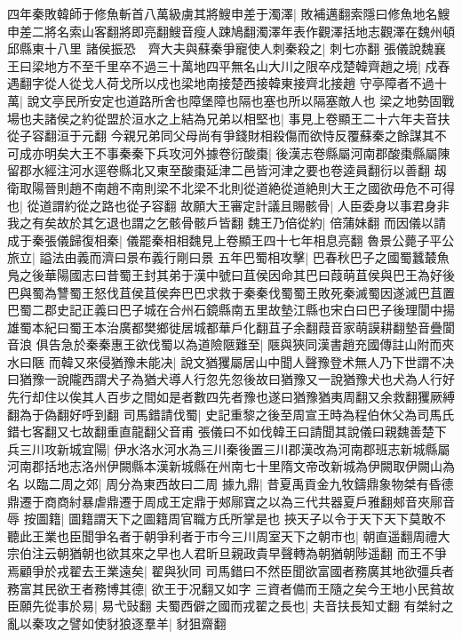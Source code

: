 四年秦敗韓師于修魚斬首八萬級虜其將䱸申差于濁澤|{
	敗補邁翻索隱曰修魚地名䱸申差二將名索山客翻將即亮翻䱸音瘦人踈鳩翻濁澤年表作觀澤括地志觀澤在魏州頓邱縣東十八里}
諸侯振恐　齊大夫與蘇秦爭寵使人刺秦殺之|{
	刺七亦翻}
張儀說魏襄王曰梁地方不至千里卒不過三十萬地四平無名山大川之限卒戍楚韓齊趙之境|{
	戍舂遇翻字從人從戈人荷戈所以戍也梁地南接楚西接韓東接齊北接趙}
守亭障者不過十萬|{
	說文亭民所安定也道路所舍也障堡障也隔也塞也所以隔塞敵人也}
梁之地勢固戰場也夫諸侯之約從盟於洹水之上結為兄弟以相堅也|{
	事見上卷顯王二十六年夫音扶從子容翻洹于元翻}
今親兄弟同父母尚有爭錢財相殺傷而欲恃反覆蘇秦之餘謀其不可成亦明矣大王不事秦秦下兵攻河外據卷衍酸棗|{
	後漢志卷縣屬河南郡酸棗縣屬陳留郡水經注河水逕卷縣北又東至酸棗延津二邑皆河津之要也卷逵員翻衍以善翻}
刼衛取陽晉則趙不南趙不南則梁不北梁不北則從道絶從道絶則大王之國欲毋危不可得也|{
	從道謂約從之路也從子容翻}
故願大王審定計議且賜骸骨|{
	人臣委身以事君身非我之有矣故於其乞退也謂之乞骸骨骸戶皆翻}
魏王乃倍從約|{
	倍蒲妹翻}
而因儀以請成于秦張儀歸復相秦|{
	儀罷秦相相魏見上卷顯王四十七年相息亮翻}
魯景公薨子平公旅立|{
	謚法由義而濟曰景布義行剛曰景}
五年巴蜀相攻擊|{
	巴春秋巴子之國蜀蠶樷魚鳬之後華陽國志曰昔蜀王封其弟于漢中號曰苴侯因命其巴曰葭萌苴侯與巴王為好後巴與蜀為讐蜀王怒伐苴侯苴侯奔巴巴求救于秦秦伐蜀蜀王敗死秦滅蜀因遂滅巴苴置巴蜀二郡史記正義曰巴子城在合州石鏡縣南五里故墊江縣也宋白曰巴子後理閬中揚雄蜀本紀曰蜀王本治廣都樊鄉徙居城都華戶化翻苴子余翻葭音家萌謨耕翻墊音疊閬音浪}
俱告急於秦秦惠王欲伐蜀以為道險陿難至|{
	陿與狹同漢書趙充國傳註山附而夾水曰陿}
而韓又來侵猶豫未能决|{
	說文猶玃屬居山中聞人聲豫登术無人乃下世謂不决曰猶豫一說隴西謂犬子為猶犬導人行忽先忽後故曰猶豫又一說猶豫犬也犬為人行好先行却住以俟其人百步之間如是者數四先者豫也遂曰猶豫猶夷周翻又余救翻玃厥縛翻為于偽翻好呼到翻}
司馬錯請伐蜀|{
	史記重黎之後至周宣王時為程伯休父為司馬氏錯七客翻又七故翻重直龍翻父音甫}
張儀曰不如伐韓王曰請聞其說儀曰親魏善楚下兵三川攻新城宜陽|{
	伊水洛水河水為三川秦後置三川郡漢改為河南郡班志新城縣屬河南郡括地志洛州伊闕縣本漢新城縣在州南七十里隋文帝改新城為伊闕取伊闕山為名}
以臨二周之郊|{
	周分為東西故曰二周}
據九鼎|{
	昔夏禹貢金九牧鑄鼎象物桀有昏德鼎遷于商商紂暴虐鼎遷于周成王定鼎于郟鄏寶之以為三代共器夏戶雅翻郟音夾鄏音辱}
按圖籍|{
	圖籍謂天下之圖籍周官職方氏所掌是也}
挾天子以令于天下天下莫敢不聽此王業也臣聞爭名者于朝爭利者于市今三川周室天下之朝市也|{
	朝直遥翻周禮大宗伯注云朝猶朝也欲其來之早也人君昕旦親政貴早聲轉為朝猶朝陟遥翻}
而王不爭焉顧爭於戎翟去王業遠矣|{
	翟與狄同}
司馬錯曰不然臣聞欲富國者務廣其地欲彊兵者務富其民欲王者務博其德|{
	欲王于况翻又如字}
三資者備而王隨之矣今王地小民貧故臣願先從事於易|{
	易弋䜴翻}
夫蜀西僻之國而戎翟之長也|{
	夫音扶長知丈翻}
有桀紂之亂以秦攻之譬如使豺狼逐羣羊|{
	豺狙齋翻}
